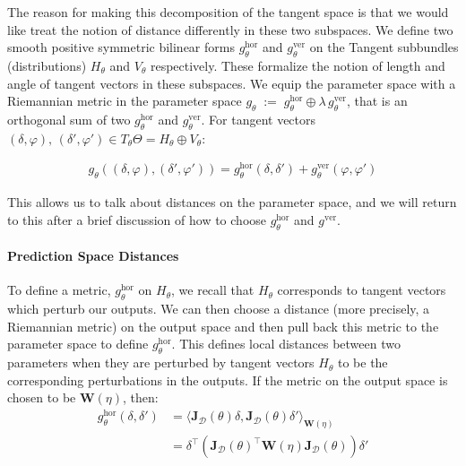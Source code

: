 The reason for making this decomposition of the tangent space is that we would like treat the notion of distance differently in these two subspaces. We define two smooth positive symmetric bilinear forms $g^{\mathrm{hor}}_\theta$ and $g^{\mathrm{ver}}_\theta$ on the Tangent subbundles (distributions) $H_\theta$ and $V_\theta$ respectively. These formalize the notion of length and angle of tangent vectors in these subspaces. We equip the parameter space with a Riemannian metric in the parameter space $g_\theta\;:=\; g^{\mathrm{hor}}_\theta \oplus \lambda\, g^{\mathrm{ver}}_\theta $, that is an orthogonal sum of two $g^{\mathrm{hor}}_\theta$ and $g^{\mathrm{ver}}_\theta$. For tangent vectors $(\delta,\varphi), \, (\delta', \varphi') \in T_\theta\Theta = H_\theta \oplus V_\theta$:

\begin{align}
    g_\theta((\delta,\varphi), (\delta', \varphi')) = g^{\mathrm{hor}}_\theta(\delta, \delta') + g^{\mathrm{ver}}_\theta(\varphi, \varphi')
\end{align}

This allows us to talk about distances on the parameter space, and we will return to this after a brief discussion of how to choose $g^{\mathrm{hor}}_\theta$ and $g^{\mathrm{ver}}$.
\paragraph{Prediction Space Distances}
To define a metric, $g^{\mathrm{hor}}_\theta$ on $H_\theta$, we recall that $H_\theta$ corresponds to tangent vectors which perturb our outputs. We can then choose a distance (more precisely, a Riemannian metric) on the output space and then pull back this metric to the parameter space to define $g^{\mathrm{hor}}_\theta$. This defines local distances between two parameters when they are perturbed by tangent vectors $H_\theta$ to be the corresponding perturbations in the outputs. If the metric on the output space is chosen to be $\mathbf{W}(\eta)$, then:
\begin{align}
    g^{\mathrm{hor}}_\theta(\delta, \delta') &= \langle \mathbf{J}_\mathcal{D}(\theta)\delta, \mathbf{J}_\mathcal{D}(\theta)\delta'   \rangle_{\mathbf{W}
    (\eta)} \\
    &= \delta^\top (\mathbf{J}_\mathcal{D}(\theta)^\top \mathbf{W}
    (\eta) \mathbf{J}_\mathcal{D}(\theta)) \delta'
\end{align}

